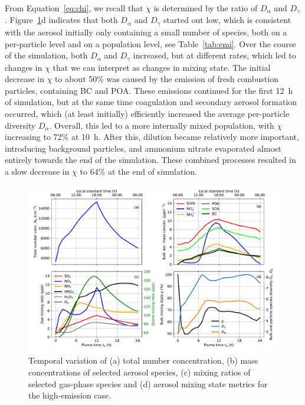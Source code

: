 \documentclass[edeposit,fullpage]{uiucthesis2009}
\begin{document}
From Equation~\ref{eq:chi}, we recall that $\chi$ is determined by the
ratio of $D_{\alpha}$ and $D_{\gamma}$. Figure~\ref{fig:urban_plume}d
indicates that both $D_{\alpha}$ and $D_{\gamma}$ started out low,
which is consistent with the aerosol initially only containing a small
number of species, both on a per-particle level and on a population
level, see Table~\ref{tab:emi}. Over the course of the simulation,
both $D_{\alpha}$ and $D_{\gamma}$ increased, but at different rates,
which led to changes in $\chi$ that we can interpret as changes in
mixing state. The initial decrease in $\chi$ to about 50\% was caused
by the emission of fresh combustion particles, containing BC and
POA. These emissions continued for the first 12~h of simulation, but
at the same time coagulation and secondary aerosol formation occurred,
which (at least initially) efficiently increased the average
per-particle diversity $D_{\alpha}$. Overall, this
led to a more internally mixed population, with $\chi$ increasing to
72\% at 10~h. After this, dilution became relatively more important,
introducing background particles, and ammonium nitrate evaporated
almost entirely towards the end of the simulation. These combined
processes resulted in a slow decrease in $\chi$ to 64\% at the end of
simulation.

\begin{figure}
    \centering
    \includegraphics[scale=0.50]{chap3_figs/fig2.pdf}
    \caption{Temporal variation of (a) total number concentration, (b)
      mass concentrations of selected aerosol species, (c) mixing
      ratios of selected gas-phase species and (d) aerosol mixing
      state metrics for the high-emission case. }
    \label{fig:urban_plume}
\end{figure}
\end{document}
